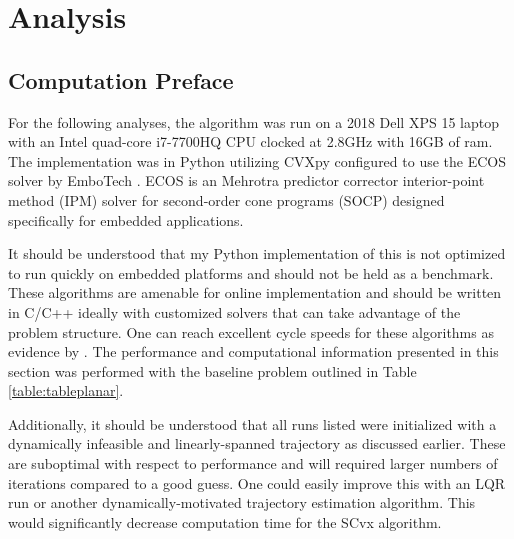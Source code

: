 \chapter{Analysis}
\label{analysis}

\section{Computation Preface}

For the following analyses, the algorithm was run on a 2018 Dell XPS 15 laptop with an Intel quad-core i7-7700HQ CPU clocked at 2.8GHz with 16GB of ram. The implementation was in Python utilizing CVXpy configured to use the ECOS solver by EmboTech \cite{domahidi2013ecos}. ECOS is an Mehrotra predictor corrector interior-point method (IPM) solver for second-order cone programs (SOCP) designed specifically for embedded applications.

It should be understood that my Python implementation of this is not optimized to run quickly on embedded platforms and should not be held as a benchmark. These algorithms are amenable for online implementation and should be written in C/C++ ideally with customized solvers that can take advantage of the problem structure. One can reach excellent cycle speeds for these algorithms as evidence by \cite{szmuk2019successive}. The performance and computational information presented in this section was performed with the baseline problem outlined in Table \ref{table:tableplanar}.

Additionally, it should be understood that all runs listed were initialized with a dynamically infeasible and linearly-spanned trajectory as discussed earlier. These are suboptimal with respect to performance and will required larger numbers of iterations compared to a good guess. One could easily improve this with an LQR run or another dynamically-motivated trajectory estimation algorithm. This would significantly decrease computation time for the SCvx algorithm.

